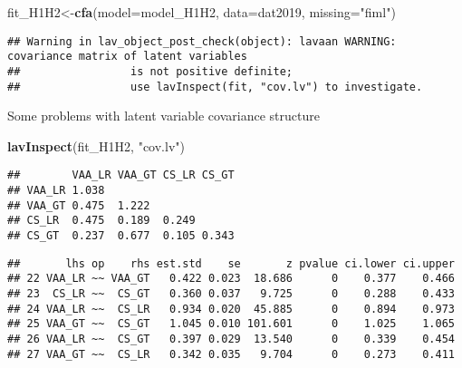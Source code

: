 \documentclass[
]{article}
\newenvironment{Shaded}{\begin{snugshade}}{\end{snugshade}}
\newcommand{\CommentTok}[1]{\textcolor[rgb]{0.56,0.35,0.01}{\textit{#1}}}
\newcommand{\DataTypeTok}[1]{\textcolor[rgb]{0.13,0.29,0.53}{#1}}
\newcommand{\KeywordTok}[1]{\textcolor[rgb]{0.13,0.29,0.53}{\textbf{#1}}}
\newcommand{\NormalTok}[1]{#1}
\newcommand{\OperatorTok}[1]{\textcolor[rgb]{0.81,0.36,0.00}{\textbf{#1}}}
\newcommand{\StringTok}[1]{\textcolor[rgb]{0.31,0.60,0.02}{#1}}
\begin{document}
\begin{Shaded}
\begin{Highlighting}[]
\NormalTok{fit_H1H2<-}\KeywordTok{cfa}\NormalTok{(}\DataTypeTok{model=}\NormalTok{model_H1H2,}
              \DataTypeTok{data=}\NormalTok{dat2019,}
              \DataTypeTok{missing=}\StringTok{"fiml"}\NormalTok{)}
\end{Highlighting}
\end{Shaded}

\begin{verbatim}
## Warning in lav_object_post_check(object): lavaan WARNING: covariance matrix of latent variables
##                 is not positive definite;
##                 use lavInspect(fit, "cov.lv") to investigate.
\end{verbatim}

Some problems with latent variable covariance structure

\begin{Shaded}
\begin{Highlighting}[]
\KeywordTok{lavInspect}\NormalTok{(fit_H1H2, }\StringTok{"cov.lv"}\NormalTok{)}
\end{Highlighting}
\end{Shaded}

\begin{verbatim}
##        VAA_LR VAA_GT CS_LR CS_GT
## VAA_LR 1.038                    
## VAA_GT 0.475  1.222             
## CS_LR  0.475  0.189  0.249      
## CS_GT  0.237  0.677  0.105 0.343
\end{verbatim}

\begin{Shaded}
\end{Shaded}

\begin{verbatim}
##       lhs op    rhs est.std    se       z pvalue ci.lower ci.upper
## 22 VAA_LR ~~ VAA_GT   0.422 0.023  18.686      0    0.377    0.466
## 23  CS_LR ~~  CS_GT   0.360 0.037   9.725      0    0.288    0.433
## 24 VAA_LR ~~  CS_LR   0.934 0.020  45.885      0    0.894    0.973
## 25 VAA_GT ~~  CS_GT   1.045 0.010 101.601      0    1.025    1.065
## 26 VAA_LR ~~  CS_GT   0.397 0.029  13.540      0    0.339    0.454
## 27 VAA_GT ~~  CS_LR   0.342 0.035   9.704      0    0.273    0.411
\end{verbatim}
\end{document}
